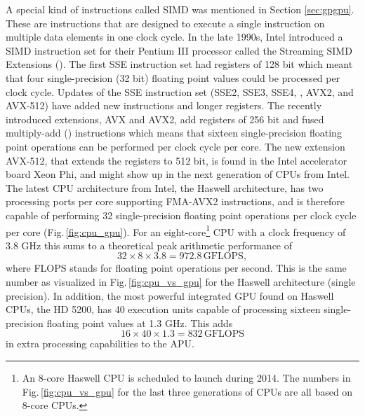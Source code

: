 A special kind of instructions called SIMD was mentioned in Section \ref{sec:gpgpu}. These are instructions that are designed to execute a single instruction on multiple data elements in one clock cycle. In the late 1990s, Intel introduced a SIMD instruction set for their Pentium III processor called the Streaming SIMD Extensions (). The first SSE instruction set had registers of 128 bit which meant that four single-precision (32 bit) floating point values could be processed per clock cycle. Updates of the SSE instruction set (SSE2, SSE3, SSE4, , AVX2, and AVX-512) have added new instructions and longer registers. The recently introduced extensions, AVX and AVX2, add registers of 256 bit and fused multiply-add () instructions  which means that sixteen single-precision floating point operations can be performed per clock cycle per core. The new extension AVX-512, that extends the registers to 512 bit, is found in the Intel accelerator board Xeon Phi, and might show up in the next generation of CPUs from Intel. The latest CPU architecture from Intel, the Haswell architecture, has two processing ports per core supporting FMA-AVX2 instructions, and is therefore capable of performing 32 single-precision floating point operations per clock cycle per core (Fig.\,\ref{fig:cpu_gpu}). For an eight-core\footnote{An 8-core Haswell CPU is scheduled to launch during 2014. The numbers in Fig.\,\ref{fig:cpu_vs_gpu} for the last three generations of CPUs are all based on 8-core CPUs.} CPU with a clock frequency of 3.8 GHz this sums to a theoretical peak arithmetic performance of
\begin{equation}
32 \times 8 \times 3.8 = 972.8\,\text{GFLOPS},
\end{equation}
where FLOPS stands for floating point operations per second. This is the same number as visualized in Fig.\,\ref{fig:cpu_vs_gpu} for the Haswell architecture (single precision). In addition, the most powerful integrated GPU found on Haswell CPUs, the HD 5200, has 40 execution units capable of processing sixteen single-precision floating point values at 1.3 GHz. This adds
\begin{equation}
16 \times 40 \times 1.3 = 832\,\text{GFLOPS}
\end{equation}
in extra processing capabilities to the APU.

